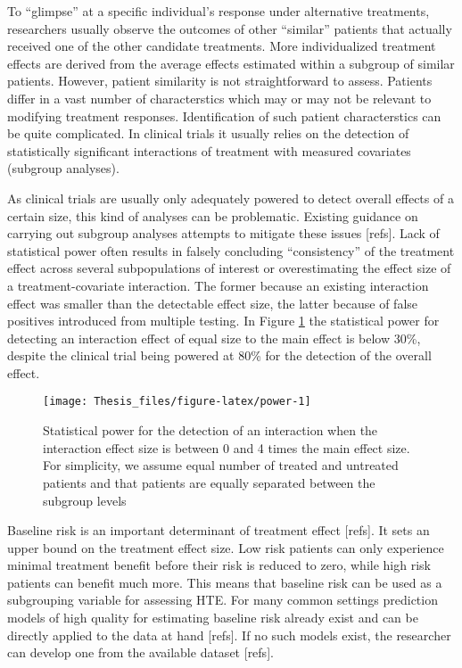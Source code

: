 \documentclass[
]{book}
\begin{document}
To ``glimpse'' at a specific individual's response under alternative treatments,
researchers usually observe the outcomes of other ``similar'' patients that
actually received one of the other candidate treatments. More individualized
treatment effects are derived from the average effects estimated within a
subgroup of similar patients. However, patient similarity is not straightforward
to assess. Patients differ in a vast number of characterstics which may or may
not be relevant to modifying treatment responses. Identification of such patient
characterstics can be quite complicated. In clinical trials it usually relies on
the detection of statistically significant interactions of treatment with
measured covariates (subgroup analyses).

As clinical trials are usually only adequately powered to detect overall effects
of a certain size, this kind of analyses can be problematic. Existing guidance
on carrying out subgroup analyses attempts to mitigate these issues {[}refs{]}. Lack
of statistical power often results in falsely concluding ``consistency'' of the
treatment effect across several subpopulations of interest or overestimating the
effect size of a treatment-covariate interaction. The former because an existing
interaction effect was smaller than the detectable effect size, the latter
because of false positives introduced from multiple testing. In Figure
\ref{fig:power} the statistical power for detecting an interaction effect of
equal size to the main effect is below 30\%, despite the clinical trial being
powered at 80\% for the detection of the overall effect.

\begin{figure}
\texttt{[image: Thesis\_files/figure-latex/power-1]} \caption{Statistical power for the detection of an interaction when the interaction effect size is between 0 and 4 times the main effect size. For simplicity, we assume equal number of treated and untreated patients and that patients are equally separated between the subgroup levels}\label{fig:power}
\end{figure}

Baseline risk is an important determinant of treatment effect {[}refs{]}. It sets an
upper bound on the treatment effect size. Low risk patients can only experience
minimal treatment benefit before their risk is reduced to zero, while high risk
patients can benefit much more. This means that baseline risk can be used as a
subgrouping variable for assessing HTE. For many common settings prediction
models of high quality for estimating baseline risk already exist and can be
directly applied to the data at hand {[}refs{]}. If no such models exist, the
researcher can develop one from the available dataset {[}refs{]}.
\end{document}
